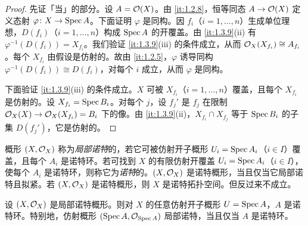 \begin{proof}
先证「当」的部分。设 $A=\mathcal{O}(X)$。由 \ref{it:1.2.8}，恒等同态 $A\to \mathcal{O}(X)$ 定义态射 $\varphi\colon X\to \operatorname{Spec} A$。下面证明 $\varphi$ 是同构。因 $f_i$（$i=1,\dots,n$）生成单位理想，$D(f_i)$（$i=1,\dots,n$）构成 $\operatorname{Spec} A$ 的开覆盖。由 \ref{it:1.3.9}(ii) 有 $\varphi^{-1}(D(f_i))=X_{f_i}$。我们验证 \ref{it:1.3.9}(iii) 的条件成立，从而 $\mathcal{O}_X(X_{f_i})\cong A_{f_i}$。每个 $X_{f_i}$ 由假设是仿射的。故由 \ref{it:1.2.5}，$\varphi$ 诱导同构 $\varphi^{-1}(D(f_i))\cong D(f_i)$，对每个 $i$ 成立，从而 $\varphi$ 是同构。

下面验证 \ref{it:1.3.9}(iii) 的条件成立。$X$ 可被 $X_{f_i}$（$i=1,\dots,n$）覆盖，且每个 $X_{f_i}$ 是仿射的。设 $X_{f_i}=\operatorname{Spec} B_i$。对每个 $j$，设 $f_j'$ 是 $f_j$ 在限制 $\mathcal{O}_X(X)\to \mathcal{O}_X(X_{f_i})=B_i$ 下的像。由 \ref{it:1.3.9}(ii)，$X_{f_i}\cap X_{f_j}$ 等于 $\operatorname{Spec} B_i$ 的子集 $D(f_j')$，它是仿射的。
\end{proof}

概形 $(X,\mathcal{O}_X)$ 称为\emph{局部诺特}的，若它可被仿射开子概形 $U_i=\operatorname{Spec} A_i$（$i\in I$）覆盖，且每个 $A_i$ 是诺特环。若可找到 $X$ 的有限仿射开覆盖 $U_i=\operatorname{Spec} A_i$（$i\in I$），使每个 $A_i$ 是诺特环，则称它为\emph{诺特}的。$(X,\mathcal{O}_X)$ 是诺特概形，当且仅当它局部诺特且拟紧。若 $(X,\mathcal{O}_X)$ 是诺特概形，则 $X$ 是诺特拓扑空间。但反过来不成立。

\begin{proposition}\label{it:1.3.11}
设 $(X,\mathcal{O}_X)$ 是局部诺特概形。则对 $X$ 的任意仿射开子概形 $U=\operatorname{Spec} A$，$A$ 是诺特环。特别地，仿射概形 $(\operatorname{Spec} A,\mathcal{O}_{\operatorname{Spec} A})$ 局部诺特，当且仅当 $A$ 是诺特环。
\end{proposition}

